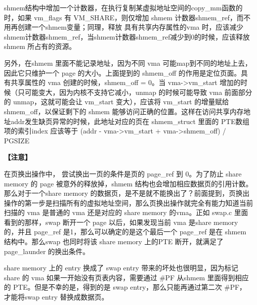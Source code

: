 shmem结构中增加一个计数器，在执行复制某虚拟地址空间的copy\_mm函数的时，如果
vm\_flags 有 VM\_SHARE，则仅增加 shmem
计数器shmem\_ref，而不用再创建一个shmem变量；同理，释放
具有共享内存属性的vma
时，应该减少shmem计数器shmem\_ref，当shmem计数器shmem\_ref减少到0的时候，应该释放
shmem 所占有的资源。

另外，在shmem 里面不能记录地址，因为不同 vma
可能map到不同的地址上去，因此它只维护一个 page 的大小。上面提到的
shmem\_off 的作用是定位页面。具有共享属性的 vma 创建的时候，shmem\_off =
0。当 vma-\textgreater{}vm\_start
增加的时候（只可能变大，因为内核不支持它减小，unmap 的时候可能导致 vma
前面部分的 unmap，这就可能会让 vm\_start 变大），应该将 vm\_start
的增量赋给 shmem\_off，以保证剩下的 shmem
能够访问正确的位置。这样在访问共享内存地址addr发生缺页异常的时候，此地址对应的页在
shmem\_struct 里面的 PTE数组项的索引index 应该等于 (addr -
vma-\textgreater{}vm\_start + vma-\textgreater{}shmem\_off) / PGSIZE

\textbf{【注意】}

在页换出操作中， 尝试换出一页的条件是页的 page\_ref 到 0。为了防止 share
memory 的 page 被意外的释放掉，shmem
结构也会增加相应数据页的引用计数。那么对于一个share memory
的数据页，是不是就不能换出了？前面提到，页换出操作的第一步是扫描所有的虚拟地址空间，那么页换出操作就完全有能力知道当前扫描的
vma 是普通的 vma 还是对应的 share memory 的vma。正如 swap.c
里面看到的那样，swap 断开一个 page 以后，如果发现当前 vma 是share memory
的，并且 page\_ref 是1，那么可以确定的是这个最后一个 page\_ref 是在
shmem 结构中。那么swap 也同时将该 share memory 上的PTE 断开，就满足了
page\_launder 的换出条件。

share memory 上的 entry 换成了 swap entry
带来的坏处也很明显，因为标记share 的 vma
如果一开始没有页表内容，需要通过 \#PF 从shmem 里面得到相应的
PTE。但是不幸的是，得到的是 swap entry，那么只能再通过第二次
\#PF，才能将swap entry 替换成数据页。
